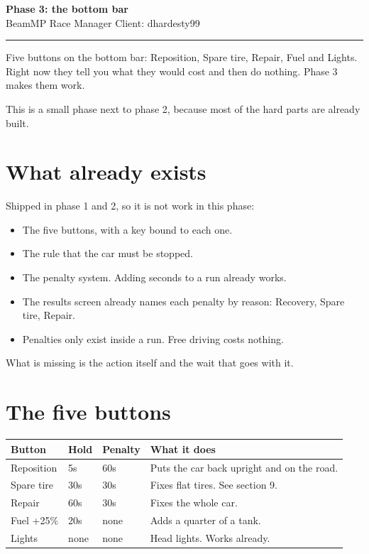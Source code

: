 \documentclass[11pt,a4paper]{article}
\begin{document}
\begin{center}
{\LARGE\bfseries Phase 3: the bottom bar}\\[4pt]
{\small BeamMP Race Manager \quad Client: dhardesty99}
\end{center}

\vspace{4pt}
\hrule
\vspace{8pt}

Five buttons on the bottom bar: Reposition, Spare tire, Repair, Fuel and
Lights. Right now they tell you what they would cost and then do nothing.
Phase 3 makes them work.

This is a small phase next to phase 2, because most of the hard parts are
already built.

\section{What already exists}

Shipped in phase 1 and 2, so it is not work in this phase:

\begin{itemize}
  \item The five buttons, with a key bound to each one.
  \item The rule that the car must be stopped.
  \item The penalty system. Adding seconds to a run already works.
  \item The results screen already names each penalty by reason: Recovery,
        Spare tire, Repair.
  \item Penalties only exist inside a run. Free driving costs nothing.
\end{itemize}

What is missing is the action itself and the wait that goes with it.

\section{The five buttons}

\begin{longtable}{@{}p{26mm}p{14mm}p{16mm}p{68mm}@{}}
\toprule
\textbf{Button} & \textbf{Hold} & \textbf{Penalty} & \textbf{What it does} \\
\midrule
\endhead
Reposition & 5s & 60s  & Puts the car back upright and on the road. \\
Spare tire & 30s & 30s & Fixes flat tires. See section 9. \\
Repair     & 60s & 30s & Fixes the whole car. \\
Fuel +25\% & 20s & none & Adds a quarter of a tank. \\
Lights     & none & none & Head lights. Works already. \\
\bottomrule
\end{longtable}
\end{document}
